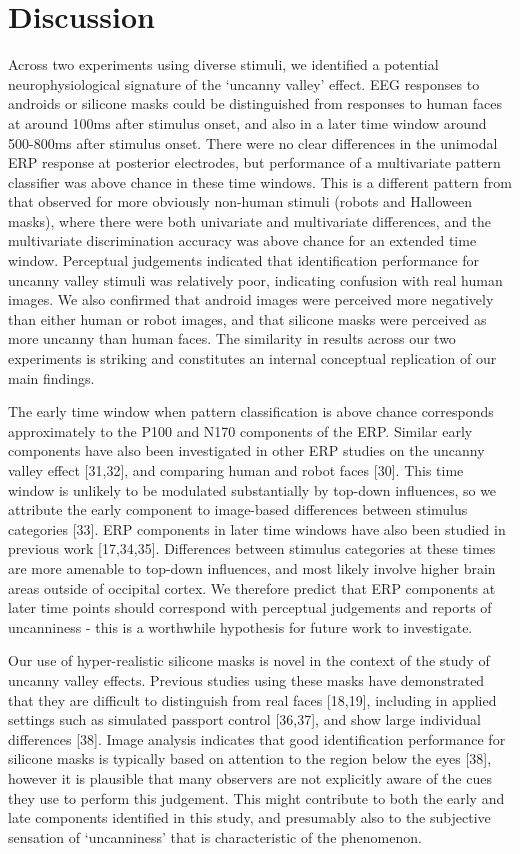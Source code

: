 \documentclass[
]{article}
\begin{document}
\section{Discussion}\label{discussion}

Across two experiments using diverse stimuli, we identified a potential neurophysiological signature of the `uncanny valley' effect. EEG responses to androids or silicone masks could be distinguished from responses to human faces at around 100ms after stimulus onset, and also in a later time window around 500-800ms after stimulus onset. There were no clear differences in the unimodal ERP response at posterior electrodes, but performance of a multivariate pattern classifier was above chance in these time windows. This is a different pattern from that observed for more obviously non-human stimuli (robots and Halloween masks), where there were both univariate and multivariate differences, and the multivariate discrimination accuracy was above chance for an extended time window. Perceptual judgements indicated that identification performance for uncanny valley stimuli was relatively poor, indicating confusion with real human images. We also confirmed that android images were perceived more negatively than either human or robot images, and that silicone masks were perceived as more uncanny than human faces. The similarity in results across our two experiments is striking and constitutes an internal conceptual replication of our main findings.

The early time window when pattern classification is above chance corresponds approximately to the P100 and N170 components of the ERP. Similar early components have also been investigated in other ERP studies on the uncanny valley effect {[}31,32{]}, and comparing human and robot faces {[}30{]}. This time window is unlikely to be modulated substantially by top-down influences, so we attribute the early component to image-based differences between stimulus categories {[}33{]}. ERP components in later time windows have also been studied in previous work {[}17,34,35{]}. Differences between stimulus categories at these times are more amenable to top-down influences, and most likely involve higher brain areas outside of occipital cortex. We therefore predict that ERP components at later time points should correspond with perceptual judgements and reports of uncanniness - this is a worthwhile hypothesis for future work to investigate.

Our use of hyper-realistic silicone masks is novel in the context of the study of uncanny valley effects. Previous studies using these masks have demonstrated that they are difficult to distinguish from real faces {[}18,19{]}, including in applied settings such as simulated passport control {[}36,37{]}, and show large individual differences {[}38{]}. Image analysis indicates that good identification performance for silicone masks is typically based on attention to the region below the eyes {[}38{]}, however it is plausible that many observers are not explicitly aware of the cues they use to perform this judgement. This might contribute to both the early and late components identified in this study, and presumably also to the subjective sensation of `uncanniness' that is characteristic of the phenomenon.
\end{document}
